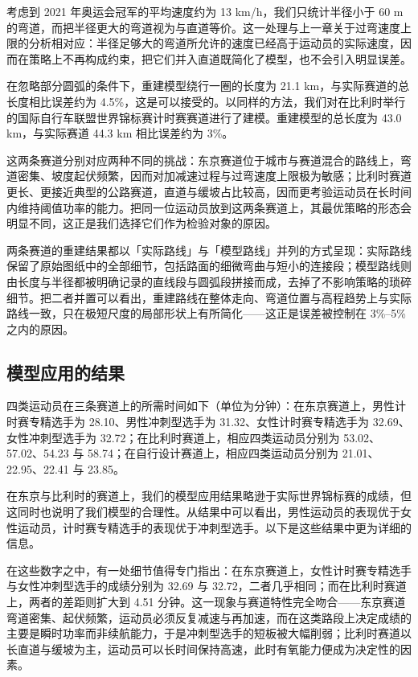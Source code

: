 \documentclass[11pt,a4paper]{ctexart}
\begin{document}
考虑到 2021 年奥运会冠军的平均速度约为 13 km/h，我们只统计半径小于 60 m 的弯道，而把半径更大的弯道视为与直道等价。这一处理与上一章关于过弯速度上限的分析相对应：半径足够大的弯道所允许的速度已经高于运动员的实际速度，因而在策略上不再构成约束，把它们并入直道既简化了模型，也不会引入明显误差。

在忽略部分圆弧的条件下，重建模型绕行一圈的长度为 21.1 km，与实际赛道的总长度相比误差约为 4.5\%，这是可以接受的。以同样的方法，我们对在比利时举行的国际自行车联盟世界锦标赛计时赛赛道进行了建模。重建模型的总长度为 43.0 km，与实际赛道 44.3 km 相比误差约为 3\%。

这两条赛道分别对应两种不同的挑战：东京赛道位于城市与赛道混合的路线上，弯道密集、坡度起伏频繁，因而对加减速过程与过弯速度上限极为敏感；比利时赛道更长、更接近典型的公路赛道，直道与缓坡占比较高，因而更考验运动员在长时间内维持阈值功率的能力。把同一位运动员放到这两条赛道上，其最优策略的形态会明显不同，这正是我们选择它们作为检验对象的原因。

两条赛道的重建结果都以「实际路线」与「模型路线」并列的方式呈现：实际路线保留了原始图纸中的全部细节，包括路面的细微弯曲与短小的连接段；模型路线则由长度与半径都被明确记录的直线段与圆弧段拼接而成，去掉了不影响策略的琐碎细节。把二者并置可以看出，重建路线在整体走向、弯道位置与高程趋势上与实际路线一致，只在极短尺度的局部形状上有所简化——这正是误差被控制在 3\%--5\% 之内的原因。

\subsection{模型应用的结果}

四类运动员在三条赛道上的所需时间如下（单位为分钟）：在东京赛道上，男性计时赛专精选手为 28.10、男性冲刺型选手为 31.32、女性计时赛专精选手为 32.69、女性冲刺型选手为 32.72；在比利时赛道上，相应四类运动员分别为 53.02、57.02、54.23 与 58.74；在自行设计赛道上，相应四类运动员分别为 21.01、22.95、22.41 与 23.85。

在东京与比利时的赛道上，我们的模型应用结果略逊于实际世界锦标赛的成绩，但这同时也说明了我们模型的合理性。从结果中可以看出，男性运动员的表现优于女性运动员，计时赛专精选手的表现优于冲刺型选手。以下是这些结果中更为详细的信息。

在这些数字之中，有一处细节值得专门指出：在东京赛道上，女性计时赛专精选手与女性冲刺型选手的成绩分别为 32.69 与 32.72，二者几乎相同；而在比利时赛道上，两者的差距则扩大到 4.51 分钟。这一现象与赛道特性完全吻合——东京赛道弯道密集、起伏频繁，运动员必须反复减速与再加速，而在这类路段上决定成绩的主要是瞬时功率而非续航能力，于是冲刺型选手的短板被大幅削弱；比利时赛道以长直道与缓坡为主，运动员可以长时间保持高速，此时有氧能力便成为决定性的因素。
\end{document}
